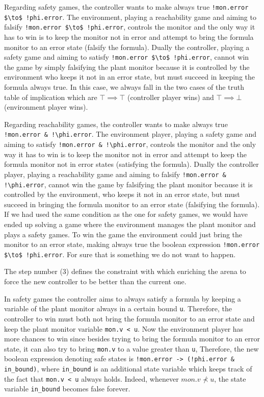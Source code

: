 Regarding safety games, the controller wants to make always true \lstinline{!mon.error $\to$ !phi.error}.
The environment, playing a reachability game and aiming to falsify \lstinline{!mon.error $\to$ !phi.error}, controls the monitor and the only way it has to win is to keep the monitor not in error and attempt to bring the formula monitor to an error state (falsify the formula). 
Dually the controller, playing a safety game and aiming to satisfy \lstinline{!mon.error $\to$ !phi.error}, cannot win the game by simply falsifying the plant monitor because it is controlled by the environment who keeps it not in an error state, but must succeed in keeping the formula always true.
In this case, we always fall in the two cases of the truth table of implication which are $\top \implies \top$ (controller player wins) and $\top \implies \bot$ (environment player wins).

Regarding reachability games, the controller wants to make always true \lstinline{!mon.error & !\phi.error}.
The environment player, playing a safety game and aiming to satisfy \lstinline{!mon.error & !\phi.error}, controls the monitor and the only way it has to win is to keep the monitor not in error and attempt to keep the formula monitor not in error states (satisfying the formula).
Dually the controller player, playing a reachability game and aiming to falsify \lstinline{!mon.error & !\phi.error}, cannot win the game by falsifying the plant monitor because it is controlled by the environment, who keeps it not in an error state, but must succeed in bringing the formula monitor to an error state (falsifying the formula).
If we had used the same condition as the one for safety games, we would have ended up solving a game where the environment manages the plant monitor and plays a safety games. To win the game the environment could just bring the monitor to an error state, making always true the boolean expression \lstinline{!mon.error $\to$ !phi.error}.
For sure that is something we do not want to happen. 

The step number (3) defines the constraint with which enriching the arena to force the new controller to be better than the current one.

In safety games the controller aims to always satisfy a formula by keeping a variable of the plant monitor always in a certain bound \lstinline{u}.
Therefore, the controller to win must both not bring the formula monitor to an error state and keep the plant monitor variable \lstinline{mon.v < u}.
Now the environment player has more chances to win since besides trying to bring the formula monitor to an error state, it can also try to bring \lstinline{mon.v} to a value greater than \lstinline{u},
Therefore, the new boolean expression denoting safe states is \lstinline{!mon.error -> (!phi.error & in_bound)}, where \lstinline{in_bound} is an additional state variable which keeps track of the fact that \lstinline{mon.v < u} always holds.
Indeed, whenever $mon.v \not\prec u$, the state variable \lstinline{in_bound} becomes false forever.

